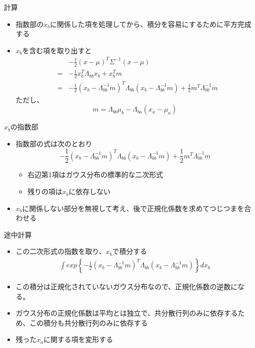 \begin{frame}{計算}
 \begin{itemize}
  \item 指数部の$x_b$に関係した項を処理してから、積分を容易にするために平方完成する
  \item $x_b$を含む項を取り出すと
        \begin{eqnarray*}
         && -\frac{1}{2}(x - \mu)^{T}\Sigma^{-1}(x-\mu) \\
         &=&-\frac{1}{2}x^T_b\Lambda_{bb}x_b+x^T_bm \\
         &=& -\frac{1}{2}(x_b-\Lambda_{bb}^{-1}m)^T\Lambda_{bb}(x_b-\Lambda_{bb}^{-1}m) + \frac{1}{2}m^T\Lambda_{bb}^{-1}m
        \end{eqnarray*}
        ただし、
        \begin{equation*}
         m =  \Lambda_{bb}\mu_b - \Lambda_{ba}(x_a-\mu_a)
        \end{equation*}
 \end{itemize}
\end{frame}

\begin{frame}{$x_b$の指数部}
 \begin{itemize}
  \item 指数部の式は次のとおり
        \begin{equation}
         -\frac{1}{2}(x_b-\Lambda_{bb}^{-1}m)^T\Lambda_{bb}(x_b-\Lambda_{bb}^{-1}m) + \frac{1}{2}m^T\Lambda_{bb}^{-1}m
        \end{equation}
        \begin{itemize}
         \item 右辺第1項はガウス分布の標準的な二次形式
         \item 残りの項は$x_b$に依存しない
        \end{itemize}
  \item $x_b$に関係しない部分を無視して考え、後で正規化係数を求めてつじつまを合わせる
 \end{itemize}
\end{frame}


\begin{frame}{途中計算}
 \begin{itemize}
  \item この二次形式の指数を取り、$x_b$で積分する
        \begin{eqnarray}
         \int exp\left\{-\frac{1}{2}(x_b-\Lambda_{bb}^{-1}m)^T\Lambda_{bb}(x_b-\Lambda_{bb}^{-1}m)\right\}dx_b
        \end{eqnarray}
  \item この積分は正規化されていないガウス分布なので、正規化係数の逆数になる。
  \item ガウス分布の正規化係数は平均とは独立で、共分散行列のみに依存するため、この積分も共分散行列のみに依存する
  \item 残った$x_a$に関する項を変形する
 \end{itemize}
\end{frame}

